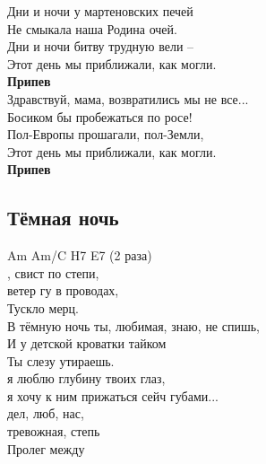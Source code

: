 \documentclass[fleqn,a5paper,12pt,twoside]{guitartabs}
\newcommand{\musVspace}{\vspace{2mm}}
\begin{document}
    Дни и ночи у мартеновских печей\\
    Не смыкала наша Родина очей. \\
    Дни и ночи битву трудную вели -- \\
    Этот день мы приближали, как могли.\\

    \-\hspace{10mm}\textbf{Припев}\\

    Здравствуй, мама, возвратились мы не все...\\
    Босиком бы пробежаться по росе!\\
    Пол-Европы прошагали, пол-Земли,\\
    Этот день мы приближали, как могли.\\

    \-\hspace{10mm}\textbf{Припев}\\
\newpage
{}%
\subsection*{Тёмная ночь}
    Am Am/C H7 E7 (2 раза)\\
    ,   свист по степи,\\
     ветер гу в проводах,\\
    Тускло  мерц.\\
    В тёмную ночь ты, любимая, знаю, не спишь,\\
    И у детской кроватки тайком\\
    Ты слезу утираешь.\musVspace\\
    \-\hspace{3mm} я люблю глубину твоих  глаз,\\
    \-\hspace{3mm} я хочу к ним прижаться сейч губами...\\
    \-\hspace{3mm} дел, люб, нас,\\
    \-\hspace{3mm} тревожная,  степь\\
    \-\hspace{3mm}Пролег между \\
    
\end{document}
